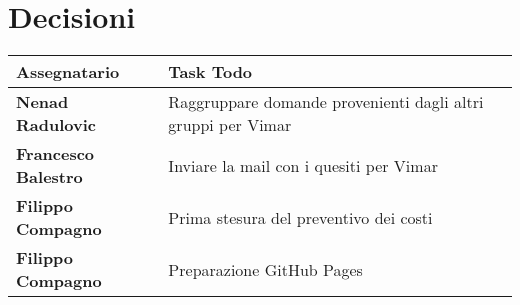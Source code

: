 \documentclass[a4paper,12pt]{article}
\begin{document}
\section{Decisioni}

\begin{tabularx}{\textwidth}{|l|X|}
\hline
\textbf{Assegnatario} & \textbf{Task Todo} \\
\hline
\textbf{Nenad Radulovic} & Raggruppare domande provenienti dagli altri gruppi per Vimar \\
\hline
\textbf{Francesco Balestro} & Inviare la mail con i quesiti per \mbox{Vimar}
\\
\hline
\textbf{Filippo Compagno} & Prima stesura del preventivo dei costi\\
\hline
\textbf{Filippo Compagno} & Preparazione GitHub Pages\\
\hline

\end{tabularx}
\end{document}
